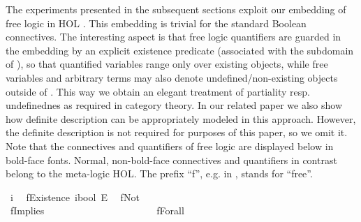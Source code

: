 \begin{isabellebody}
\begin{isamarkuptext}
The experiments presented in the subsequent sections exploit our embedding of free logic 
in HOL \cite{C57}. This embedding is trivial for the standard Boolean connectives. The interesting
aspect is that free logic quantifiers are guarded in the embedding by an explicit existence 
predicate  (associated with the subdomain  of ), so 
that quantified variables range only over existing objects, while free 
variables and arbitrary terms may also denote undefined/non-existing objects outside of . 
This way we obtain an 
elegant treatment of partiality resp. undefinednes as required in category theory. In our related 
paper \cite{C57} we also show how definite description can be appropriately modeled in this
approach. However, the definite description is not required for purposes of this paper, so we omit it.
Note that the connectives and quantifiers of free logic are displayed below in bold-face fonts. Normal, 
non-bold-face connectives and quantifiers in contrast belong to the meta-logic HOL. The prefix ``f'',
e.g. in , stands for ``free''.%
\end{isamarkuptext}\isamarkuptrue%
\isamarkupfalse%
\ i\ %
\isanewline
{}\isamarkupfalse%
\ fExistence{\isacharcolon}{\isacharcolon}\ {\isachardoublequoteopen}i{\isasymRightarrow}bool{\isachardoublequoteclose}\ {\isacharparenleft}{\isachardoublequoteopen}E{\isachardoublequoteclose}{\isacharparenright}\ %
\isanewline
\isanewline
{}\isamarkupfalse%
\ fNot\ {\isacharparenleft}{\isachardoublequoteopen}\isactrlbold {\isasymnot}{\isachardoublequoteclose}{\isacharparenright}\ %
\ \ \ \ \ \ \ \ \ \ \ \ \ \ \ \ \ \ \ \ \ \ \ \ \ \ \isanewline
\ \ {\isachardoublequoteopen}\isactrlbold {\isasymnot}{\isasymphi}\ {\isasymequiv}\ {\isasymnot}{\isasymphi}{\isachardoublequoteclose}\ \ \ \ \ \isanewline
{}\isamarkupfalse%
\ fImplies\ {\isacharparenleft}\ {\isachardoublequoteopen}\isactrlbold {\isasymrightarrow}{\isachardoublequoteclose}\ {}{}{\isacharparenright}\ %
\ \ \ \ \ \ \ \ \isanewline
\ \ {\isachardoublequoteopen}{\isasymphi}\ \isactrlbold {\isasymrightarrow}\ {\isasympsi}\ {\isasymequiv}\ {\isasymphi}\ {\isasymlongrightarrow}\ {\isasympsi}{\isachardoublequoteclose}\isanewline
{}\isamarkupfalse%
\ fForall\ {\isacharparenleft}{\isachardoublequoteopen}\isactrlbold {\isasymforall}{\isachardoublequoteclose}{\isacharparenright}\ %

\end{isabellebody}
